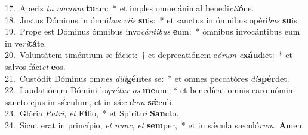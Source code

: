 {17.~}Aperis \textit{tu} \textit{ma}\textit{num} \textbf{tu}am:~* et imples omne ánimal benedi\textit{cti}\textbf{ó}ne.\\
{18.~}Justus Dóminus in ómni\textit{bus} \textit{vi}\textit{is} \textbf{su}is:~* et sanctus in ómnibus opéri\textit{bus} \textbf{su}is.\\
{19.~}Prope est Dóminus ómnibus invo\textit{cán}\textit{ti}\textit{bus} \textbf{e}um:~* ómnibus invocántibus eum in ve\textit{ri}\textbf{tá}te.\\
{20.~}Voluntátem timéntium se fáciet:~† et deprecatiónem e\textit{ó}\textit{rum} \textit{e}\textbf{xáu}diet:~* et salvos fáci\textit{et} \textbf{e}os.\\
{21.~}Custódit Dóminus om\textit{nes} \textit{di}\textit{li}\textbf{gén}tes se:~* et omnes peccatóres \textit{di}\textbf{spér}det.\\
{22.~}Laudatiónem Dómini lo\textit{qué}\textit{tur} \textit{os} \textbf{me}um:~* et benedícat omnis caro nómini sancto ejus in sǽculum, et in sǽcu\textit{lum} \textbf{sǽ}culi.\\
{23.~}Glória \textit{Pa}\textit{tri}, \textit{et} \textbf{Fí}lio,~* et Spirítu\textit{i} \textbf{San}cto.\\
{24.~}Sicut erat in princípio, \textit{et} \textit{nunc}, \textit{et} \textbf{sem}per,~* et in sǽcula sæculó\textit{rum}. \textbf{A}men.\\
